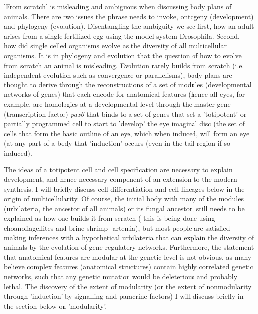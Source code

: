 'From scratch' is misleading and ambiguous when discussing body plans of animals.  There are two issues the phrase needs to invoke, ontogeny (development) and phylogeny (evolution).  Disentangling the ambiguity we see first, how an adult arises from a single fertilized egg using the model system Drosophila.  Second, how did single celled organisms evolve as the diversity of all multicellular organisms.  It is in phylogeny and evolution that the question of how to evolve from scratch an animal is misleading.  Evolution rarely builds from scratch (i.e. independent evolution such as convergence or parallelisms), body plans are thought to derive through the reconstructions of a set of modules (developmental networks of genes) that each encode for anatomical features (hence all eyes, for example, are homologies at a developmental level through the master gene (transcription factor) \textit{pax6} that binds to a set of genes that set a 'totipotent' or partially programmed cell to start to 'develop' the eye imaginal disc (the set of cells that form the basic outline of an eye, which when induced, will form an eye (at any part of a body that 'induction' occurs (even in the tail region if so induced)\cite{devogilbert}.  

The ideas of a totipotent cell and cell specification are necessary to explain development, and hence necessary component of an extension to the modern synthesis.  I will briefly discuss cell differentiation and cell lineages below in the origin of multicellularity.  Of course, the initial body with many of the modules (urbilateria, the ancestor of all animals) or its fungal ancestor, still needs to be explained as how one builds it from scratch ( this is being done using choanoflagellites and brine shrimp -artemia), but most people are satisfied making inferences with a hypothetical urbilateria that can explain the diversity of animals by the evolution of gene regulatory networks.  Furthermore, the statement that anatomical features are modular at the genetic level is not obvious, as many believe complex features (anatomical structures) contain highly correlated genetic networks, such that any genetic mutation would be deleterious and probably lethal.  The discovery of the extent of modularity (or the extent of nonmodularity through 'induction' by signalling and paracrine factors) I will discuss briefly in the section below on 'modularity'.        


